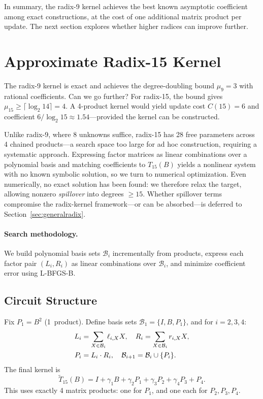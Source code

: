 \documentclass[
  journal=largetwo,
  manuscript=article,
  manuscriptlabel={Research Preprint},
  logo=false,
  simfonts=false,
  year=2026,
  volume=1,
]{cup-journal}
\theoremstyle{definition}
\theoremstyle{remark}
\begin{document}
In summary, the radix-9 kernel achieves the best known asymptotic coefficient among exact constructions, at the cost of one additional matrix product per update.
The next section explores whether higher radices can improve further.



\section{Approximate Radix-15 Kernel}
\label{sec:radix15}

The radix-9 kernel is exact and achieves the degree-doubling bound
$\mu_9 = 3$ with rational coefficients. Can we go further?
For radix-15, the bound gives $\mu_{15} \geq \lceil\log_2 14\rceil = 4$.
A 4-product kernel would yield update cost $C(15) = 6$ and coefficient
$6/\log_2 15 \approx 1.54$---provided the kernel can be constructed.

Unlike radix-9, where 8 unknowns suffice, radix-15 has 28 free
parameters across 4 chained products---a search space too large for
ad hoc construction, requiring a systematic approach.
Expressing factor matrices as linear combinations over a polynomial
basis and matching coefficients to $T_{15}(B)$ yields a nonlinear
system with no known symbolic solution, so we turn to numerical
optimization.
Even numerically, no exact solution has been found: we therefore
relax the target, allowing nonzero \emph{spillover} into degrees
$\geq 15$.
Whether spillover terms compromise the radix-kernel framework---or
can be absorbed---is deferred to Section~\ref{sec:generalradix}.

\paragraph{Search methodology.}
We build polynomial basis sets $\mathcal{B}_i$ incrementally from
products, express each factor pair $(L_i, R_i)$ as linear combinations
over $\mathcal{B}_i$, and minimize coefficient error using L-BFGS-B.

\subsection{Circuit Structure}

Fix $P_1 = B^2$ (1~product). Define basis sets
$\mathcal{B}_1 = \{I, B, P_1\}$, and for $i = 2, 3, 4$:
\begin{align}
  L_i &= \sum_{X \in \mathcal{B}_i} \ell_{i,X} X, \quad
  R_i = \sum_{X \in \mathcal{B}_i} r_{i,X} X, \label{eq:factors} \\
  P_i &= L_i \cdot R_i, \quad
  \mathcal{B}_{i+1} = \mathcal{B}_i \cup \{P_i\}. \notag
\end{align}
The final kernel is
\begin{equation}
  \label{eq:radix15kernel}
  \widetilde{T}_{15}(B) = I + \gamma_1 B + \gamma_2 P_1
    + \gamma_3 P_2 + \gamma_4 P_3 + P_4.
\end{equation}
This uses exactly 4 matrix products: one for $P_1$, and one each
for $P_2, P_3, P_4$.
\end{document}
